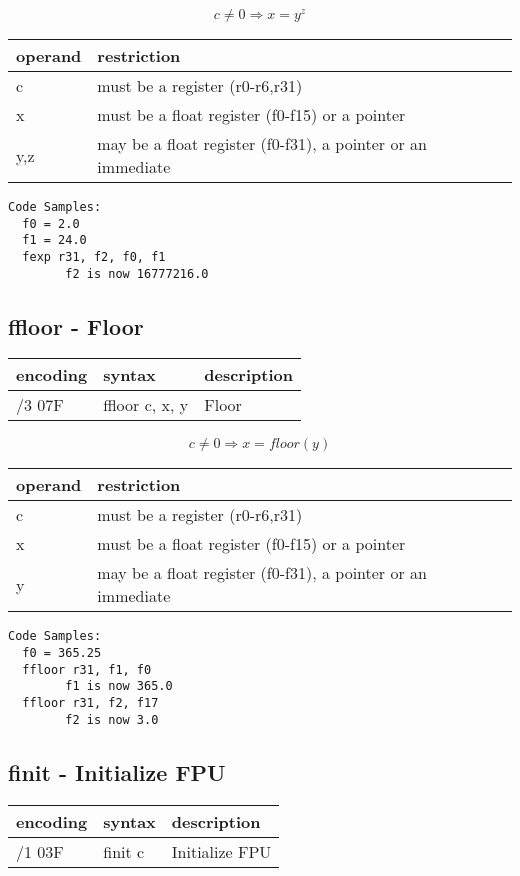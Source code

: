 \documentclass[letterpaper,10pt,openright,twoside,onecolumn]{book}
\begin{document}
  \begin{displaymath} c \neq 0 \Rightarrow x = y ^ z\end{displaymath}

  \flushleft
  \begin{tabular}{|l|l|}
   \hline
    operand & restriction \\
   \hline
    c & must be a register (r0-r6,r31) \\
    x & must be a float register (f0-f15) or a pointer \\
    y,z & may be a float register (f0-f31), a pointer or an immediate \\
   \hline
  \end{tabular}

  \begin{verbatim}
Code Samples:
  f0 = 2.0
  f1 = 24.0
  fexp r31, f2, f0, f1
        f2 is now 16777216.0
  \end{verbatim}
\newpage\subsection{ffloor - Floor}
  \begin{tabular}{|l|l|l|}
   \hline
    encoding & syntax & description \\
   \hline
    /3 07F & ffloor c, x, y & Floor \\
   \hline
  \end{tabular}

  \begin{displaymath} c \neq 0 \Rightarrow x = floor(y)\end{displaymath}

  \flushleft
  \begin{tabular}{|l|l|}
   \hline
    operand & restriction \\
   \hline
    c & must be a register (r0-r6,r31) \\
    x & must be a float register (f0-f15) or a pointer \\
    y & may be a float register (f0-f31), a pointer or an immediate \\
   \hline
  \end{tabular}

  \begin{verbatim}
Code Samples:
  f0 = 365.25
  ffloor r31, f1, f0
        f1 is now 365.0
  ffloor r31, f2, f17
        f2 is now 3.0
  \end{verbatim}
\newpage\subsection{finit - Initialize FPU}
  \begin{tabular}{|l|l|l|}
   \hline
    encoding & syntax & description \\
   \hline
    /1 03F & finit c & Initialize FPU \\
   \hline
  \end{tabular}
\end{document}
